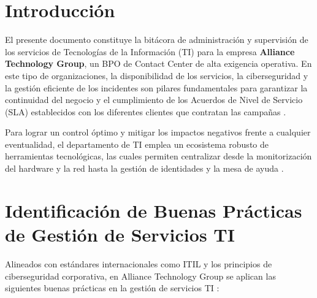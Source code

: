 


	
	

	\newpage
	\tableofcontents
	\newpage
	\doublespacing
	
	\section{Introducción}
	El presente documento constituye la bitácora de administración y supervisión de los servicios de Tecnologías de la Información (TI) para la empresa \textbf{Alliance Technology Group}, un BPO de Contact Center de alta exigencia operativa. En este tipo de organizaciones, la disponibilidad de los servicios, la ciberseguridad y la gestión eficiente de los incidentes son pilares fundamentales para garantizar la continuidad del negocio y el cumplimiento de los Acuerdos de Nivel de Servicio (SLA) establecidos con los diferentes clientes que contratan las campañas \parencite{sena2026redes}.
	
	Para lograr un control óptimo y mitigar los impactos negativos frente a cualquier eventualidad, el departamento de TI emplea un ecosistema robusto de herramientas tecnológicas, las cuales permiten centralizar desde la monitorización del hardware y la red hasta la gestión de identidades y la mesa de ayuda \parencite{sena2026servidores}.
	
	\section{Identificación de Buenas Prácticas de Gestión de Servicios TI}
	Alineados con estándares internacionales como ITIL y los principios de ciberseguridad corporativa, en Alliance Technology Group se aplican las siguientes buenas prácticas en la gestión de servicios TI \parencite{sena2026servidores, sena2026redes}:
	
